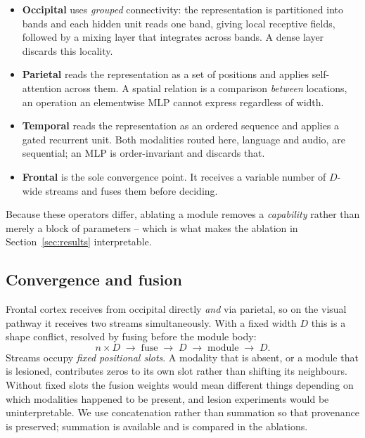\documentclass[conference]{IEEEtran}
\begin{document}
\begin{itemize}
  \item \textbf{Occipital} uses \emph{grouped} connectivity: the representation
        is partitioned into bands and each hidden unit reads one band, giving
        local receptive fields, followed by a mixing layer that integrates
        across bands. A dense layer discards this locality.
  \item \textbf{Parietal} reads the representation as a set of positions and
        applies self-attention across them. A spatial relation is a comparison
        \emph{between} locations, an operation an elementwise MLP cannot
        express regardless of width.
  \item \textbf{Temporal} reads the representation as an ordered sequence and
        applies a gated recurrent unit. Both modalities routed here, language
        and audio, are sequential; an MLP is order-invariant and discards that.
  \item \textbf{Frontal} is the sole convergence point. It receives a variable
        number of $D$-wide streams and fuses them before deciding.
\end{itemize}

Because these operators differ, ablating a module removes a \emph{capability}
rather than merely a block of parameters -- which is what makes the ablation in
Section~\ref{sec:results} interpretable.

\subsection{Convergence and fusion}

Frontal cortex receives from occipital directly \emph{and} via parietal, so on
the visual pathway it receives two streams simultaneously. With a fixed width
$D$ this is a shape conflict, resolved by fusing before the module body:
\[
n \times D \;\longrightarrow\; \mathrm{fuse} \;\longrightarrow\; D
   \;\longrightarrow\; \mathrm{module} \;\longrightarrow\; D .
\]
Streams occupy \emph{fixed positional slots}. A modality that is absent, or a
module that is lesioned, contributes zeros to its own slot rather than shifting
its neighbours. Without fixed slots the fusion weights would mean different
things depending on which modalities happened to be present, and lesion
experiments would be uninterpretable. We use concatenation rather than
summation so that provenance is preserved; summation is available and is
compared in the ablations.
\end{document}
